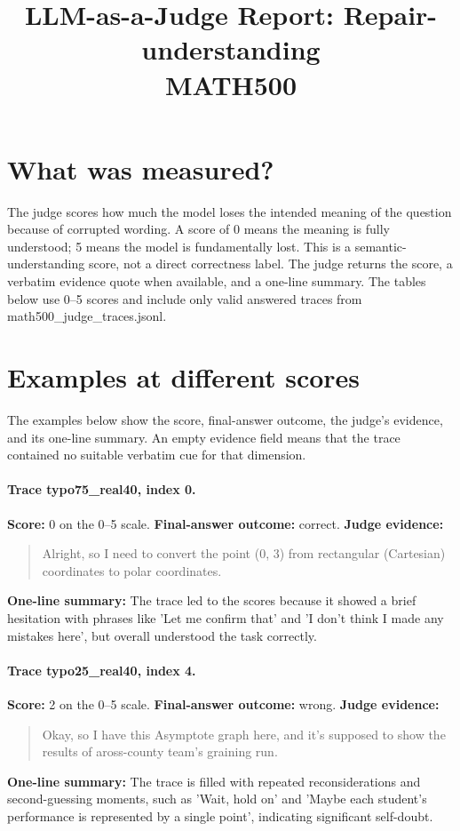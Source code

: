 \documentclass[11pt]{article}
\title{LLM-as-a-Judge Report: Repair-understanding\\\large MATH500}
\date{}
\begin{document}
\maketitle

\section*{What was measured?} The judge scores how much the model loses the intended meaning of the question because of corrupted wording. A score of 0 means the meaning is fully understood; 5 means the model is fundamentally lost. This is a semantic-understanding score, not a direct correctness label. The judge returns the score, a verbatim evidence quote when available, and a one-line summary. The tables below use 0--5 scores and include only valid answered traces from math500\_judge\_traces.jsonl.

\section*{Examples at different scores} The examples below show the score, final-answer outcome, the judge's evidence, and its one-line summary. An empty evidence field means that the trace contained no suitable verbatim cue for that dimension.

\paragraph{Trace typo75\_real40, index 0.}
\textbf{Score:} 0 on the 0--5 scale. \textbf{Final-answer outcome:} correct.
\textbf{Judge evidence:} \begin{quote}Alright, so I need to convert the point (0, 3) from rectangular (Cartesian) coordinates to polar coordinates.\end{quote}
\textbf{One-line summary:} The trace led to the scores because it showed a brief hesitation with phrases like 'Let me confirm that' and 'I don't think I made any mistakes here', but overall understood the task correctly.\medskip
\paragraph{Trace typo25\_real40, index 4.}
\textbf{Score:} 2 on the 0--5 scale. \textbf{Final-answer outcome:} wrong.
\textbf{Judge evidence:} \begin{quote}Okay, so I have this Asymptote graph here, and it's supposed to show the results of aross-county team's graining run.\end{quote}
\textbf{One-line summary:} The trace is filled with repeated reconsiderations and second-guessing moments, such as 'Wait, hold on' and 'Maybe each student's performance is represented by a single point', indicating significant self-doubt.\medskip
\end{document}
